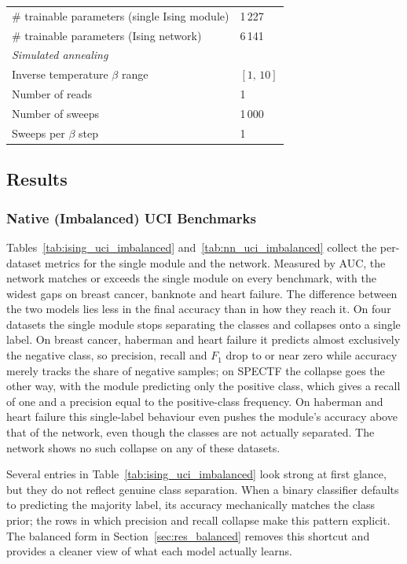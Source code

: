 \documentclass{ieeeaccess}
\begin{document}
\begin{table}[H]
\begin{tabular}{ll}
\# trainable parameters (single Ising module)   & 1\,227 \\
\# trainable parameters (Ising network)         & 6\,141 \\
\hline
\multicolumn{2}{l}{\textit{Simulated annealing}} \\
Inverse temperature $\beta$ range               & $[1,\,10]$ \\
Number of reads                                 & 1 \\
Number of sweeps                                & 1\,000 \\
Sweeps per $\beta$ step                         & 1 \\
\hline
\end{tabular}
\end{table}


\subsection{Results}\label{sec:results}

\subsubsection{Native (Imbalanced) UCI Benchmarks}\label{sec:res_imbalanced}

Tables~\ref{tab:ising_uci_imbalanced} and~\ref{tab:nn_uci_imbalanced}
collect the per-dataset metrics for the single module and the network.
Measured by AUC, the network matches or exceeds the single module on every
benchmark, with the widest gaps on breast cancer, banknote and heart failure.
The difference between the two models lies less in the final accuracy than in
how they reach it. On four datasets the single module stops separating the classes and
collapses onto a single label. On breast cancer, haberman and heart failure it
predicts almost exclusively the negative class, so precision, recall and $F_1$
drop to or near zero while accuracy merely tracks the share of negative samples; on
SPECTF the collapse goes the other way, with the module predicting only the
positive class, which gives a recall of one and a precision equal to the
positive-class frequency. On haberman and heart failure this single-label
behaviour even pushes the module's accuracy above that of the network, even
though the classes are not actually separated. The network shows no such
collapse on any of these datasets.

Several entries in
Table~\ref{tab:ising_uci_imbalanced} look strong at first glance, but they
do not reflect genuine class separation. When a binary classifier
defaults to predicting the majority label, its accuracy mechanically
matches the class prior; the rows in which precision and recall
collapse make this pattern explicit. The balanced form in
Section~\ref{sec:res_balanced} removes this shortcut and provides a
cleaner view of what each model actually learns.
\end{document}
